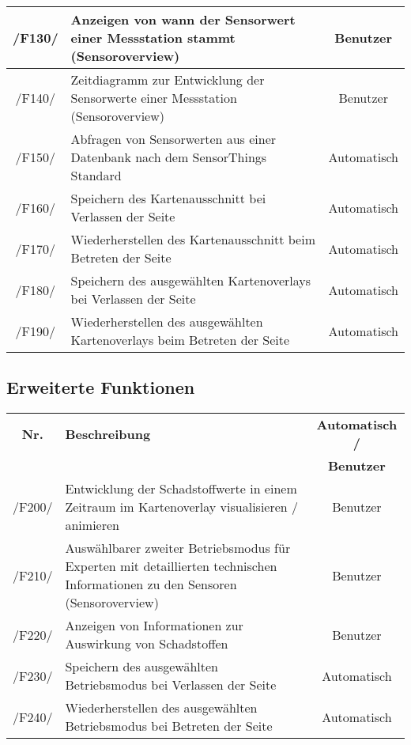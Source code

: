 \begin{tabularx}{\textwidth}{| c | X | c |}
        /F130/ & Anzeigen von wann der Sensorwert einer Messstation stammt (Sensoroverview) & Benutzer \\
        \hline
        /F140/ & Zeitdiagramm zur Entwicklung der Sensorwerte einer Messstation (Sensoroverview) & Benutzer \\
        \hline
        /F150/ & Abfragen von Sensorwerten aus einer Datenbank nach dem SensorThings Standard & Automatisch \\
        \hline
        /F160/ & Speichern des Kartenausschnitt bei Verlassen der Seite & Automatisch \\
        \hline
        /F170/ & Wiederherstellen des Kartenausschnitt beim Betreten der Seite & Automatisch \\
        \hline
        /F180/ & Speichern des ausgewählten Kartenoverlays bei Verlassen der Seite & Automatisch \\
        \hline
        /F190/ & Wiederherstellen des ausgewählten Kartenoverlays beim Betreten der Seite & Automatisch \\
        \hline
\end{tabularx}
\subsection{Erweiterte Funktionen}
\begin{tabularx}{\textwidth}{| c | X | c |}
\hline
        \textbf{Nr.} & 
        \textbf{Beschreibung} & 
        \textbf{Automatisch /} \\
        & & \textbf{Benutzer} \\
        \hline
        /F200/ & Entwicklung der Schadstoffwerte in einem Zeitraum im Kartenoverlay visualisieren / animieren & Benutzer \\
        \hline
        /F210/ & Auswählbarer zweiter Betriebsmodus für Experten mit detaillierten technischen Informationen zu den Sensoren (Sensoroverview) & Benutzer \\
        \hline
        /F220/ & Anzeigen von Informationen zur Auswirkung von Schadstoffen & Benutzer \\
        \hline
        /F230/ & Speichern des ausgewählten Betriebsmodus bei Verlassen der Seite & Automatisch \\
        \hline
        /F240/ & Wiederherstellen des ausgewählten Betriebsmodus bei Betreten der Seite & Automatisch \\
        \hline
\end{tabularx}